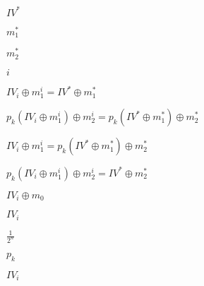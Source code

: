 \documentclass[10pt]{book}
\begin{document}
\begin{mdSnippets}
\begin{mdInlineSnippet}
$IV^*$\end{mdInlineSnippet}%
\begin{mdInlineSnippet}[0872ab8a3c266236f9ac6e5b1f874269]%
$m_1^*$\end{mdInlineSnippet}%
\begin{mdInlineSnippet}[024f1d5276f895b924b71cc42707652e]%
$m_2^*$\end{mdInlineSnippet}%
\begin{mdInlineSnippet}[865c0c0b4ab0e063e5caa3387c1a8741]%
$i$\end{mdInlineSnippet}%
\begin{mdInlineSnippet}%
$IV_i \oplus m^i_1 = IV^* \oplus m_1^*$\end{mdInlineSnippet}%
\begin{mdInlineSnippet}%
$p_k(IV_i \oplus m^i_1) \oplus m^i_2 = p_k(IV^* \oplus m_1^*) \oplus m_2^*$\end{mdInlineSnippet}%
\begin{mdInlineSnippet}[aeab7b6973ae25b9b9b46bd932e2ae03]%
$IV_i \oplus m^i_1 = p_k(IV^* \oplus m_1^*) \oplus m_2^*$\end{mdInlineSnippet}%
\begin{mdInlineSnippet}[44e04c9b3aa711ed121ce7509c8332be]%
$p_k(IV_i \oplus m^i_1) \oplus m^i_2  = IV^* \oplus m_2^*$\end{mdInlineSnippet}%
\begin{mdInlineSnippet}%
$IV_i \oplus m_0$\end{mdInlineSnippet}%
\begin{mdInlineSnippet}[a672259312fe8429e1475b84f7397226]%
$IV_i$\end{mdInlineSnippet}%
\begin{mdInlineSnippet}[cc1784df219b5f60fc351c3c720645b1]%
$\frac{1}{2^n}$\end{mdInlineSnippet}%
\begin{mdInlineSnippet}%
$p_k$\end{mdInlineSnippet}%
\begin{mdInlineSnippet}[a672259312fe8429e1475b84f7397226]%
$IV_i$\end{mdInlineSnippet}%

\end{mdSnippets}
\end{document}
